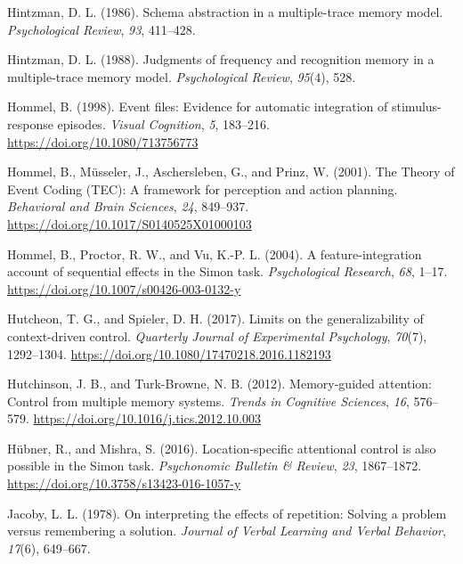 \documentclass[]{DissertateCUNY}
\begin{document}
\leavevmode\hypertarget{ref-hintzman_schema_1986}{}%
Hintzman, D. L. (1986). Schema abstraction in a multiple-trace memory
model. \emph{Psychological Review}, \emph{93}, 411--428.

\leavevmode\hypertarget{ref-hintzman_judgments_1988}{}%
Hintzman, D. L. (1988). Judgments of frequency and recognition memory in
a multiple-trace memory model. \emph{Psychological Review},
\emph{95}(4), 528.

\leavevmode\hypertarget{ref-hommel_event_1998}{}%
Hommel, B. (1998). Event files: Evidence for automatic integration of
stimulus-response episodes. \emph{Visual Cognition}, \emph{5}, 183--216.
\url{https://doi.org/10.1080/713756773}

\leavevmode\hypertarget{ref-hommel_theory_2001}{}%
Hommel, B., Müsseler, J., Aschersleben, G., and Prinz, W. (2001). The
Theory of Event Coding (TEC): A framework for perception and action
planning. \emph{Behavioral and Brain Sciences}, \emph{24}, 849--937.
\url{https://doi.org/10.1017/S0140525X01000103}

\leavevmode\hypertarget{ref-hommel_feature-integration_2004}{}%
Hommel, B., Proctor, R. W., and Vu, K.-P. L. (2004). A
feature-integration account of sequential effects in the Simon task.
\emph{Psychological Research}, \emph{68}, 1--17.
\url{https://doi.org/10.1007/s00426-003-0132-y}

\leavevmode\hypertarget{ref-hutcheon_limits_2017}{}%
Hutcheon, T. G., and Spieler, D. H. (2017). Limits on the
generalizability of context-driven control. \emph{Quarterly Journal of
Experimental Psychology}, \emph{70}(7), 1292--1304.
\url{https://doi.org/10.1080/17470218.2016.1182193}

\leavevmode\hypertarget{ref-hutchinson_memory-guided_2012}{}%
Hutchinson, J. B., and Turk-Browne, N. B. (2012). Memory-guided
attention: Control from multiple memory systems. \emph{Trends in
Cognitive Sciences}, \emph{16}, 576--579.
\url{https://doi.org/10.1016/j.tics.2012.10.003}

\leavevmode\hypertarget{ref-hubner_location-specific_2016}{}%
Hübner, R., and Mishra, S. (2016). Location-specific attentional control
is also possible in the Simon task. \emph{Psychonomic Bulletin \&
Review}, \emph{23}, 1867--1872.
\url{https://doi.org/10.3758/s13423-016-1057-y}

\leavevmode\hypertarget{ref-jacoby_interpreting_1978}{}%
Jacoby, L. L. (1978). On interpreting the effects of repetition: Solving
a problem versus remembering a solution. \emph{Journal of Verbal
Learning and Verbal Behavior}, \emph{17}(6), 649--667.
\end{document}
